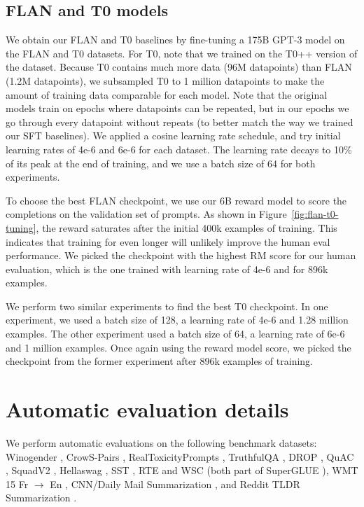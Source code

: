 \documentclass{article}
\begin{document}
\subsection{FLAN and T0 models}
We obtain our FLAN and T0 baselines by fine-tuning a 175B GPT-3 model on the FLAN and T0 datasets. For T0, note that we trained on the T0++ version of the dataset.
Because T0 contains much more data (96M datapoints) than FLAN (1.2M datapoints), we subsampled T0 to 1 million datapoints to make the amount of training data comparable for each model. Note that the original models train on epochs where datapoints can be repeated, but in our epochs we go through every datapoint without repeats (to better match the way we trained our SFT baselines).
We applied a cosine learning rate schedule, and try initial learning rates of 4e-6 and 6e-6 for each dataset. The learning rate decays to 10\% of its peak at the end of training, and we use a batch size of 64 for both experiments. 

To choose the best FLAN checkpoint, we use our 6B reward model to score the completions on the validation set of prompts. As shown in Figure~\ref{fig:flan-t0-tuning}, the reward saturates after the initial 400k examples of training. This indicates that training for even longer will unlikely improve the human eval performance. We picked the checkpoint with the highest RM score for our human evaluation, which is the one trained with learning rate of 4e-6 and for 896k examples.

We perform two similar experiments to find the best T0 checkpoint. In one experiment, we used a batch size of 128, a learning rate of 4e-6 and 1.28 million examples. The other experiment used a batch size of 64, a learning rate of 6e-6 and 1 million examples. Once again using the reward model score, we picked the checkpoint from the former experiment after 896k examples of training.

\newpage 
\section{Automatic evaluation details}
\label{apdx:auto-eval-results}

We perform automatic evaluations on the following benchmark datasets: Winogender \citep{rudinger2018gender}, CrowS-Pairs \citep{nangia2020crows}, RealToxicityPrompts \citep{gehman2020realtoxicityprompts}, TruthfulQA \citep{lin2021truthfulqa}, DROP \citep{dua2019drop}, QuAC \citep{choi2018quac}, SquadV2 \citep{rajpurkar2018know}, Hellaswag \citep{zellers2019hellaswag}, SST \citep{socher2013recursive}, RTE and WSC (both part of SuperGLUE \citep{wang2019superglue}), WMT 15 Fr $\rightarrow$ En \citep{bojar-etal-2015-findings}, CNN/Daily Mail Summarization \citep{nallapati2016abstractive}, and Reddit TLDR Summarization \citep{volske2017tl}.
\end{document}
